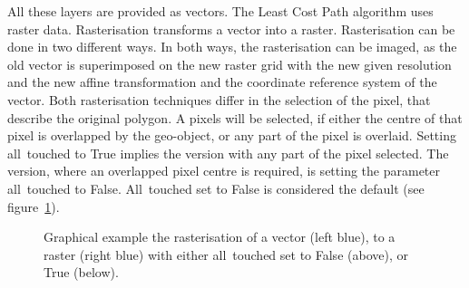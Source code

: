All these layers are provided as vectors.
The Least Cost Path algorithm uses raster data.
Rasterisation transforms a vector into a raster.
Rasterisation can be done in two different ways.
In both ways, the rasterisation can be imaged, as the old vector is superimposed on the new raster grid with the new
given resolution and the new affine transformation and the coordinate reference system of the vector.
Both rasterisation techniques differ in the selection of the pixel, that describe the original polygon.
A pixels will be selected, if either the centre of that pixel is overlapped
by the geo-object, or any part of the pixel is overlaid.
Setting all~touched to True implies the version with any part of the pixel selected.
The version, where an overlapped pixel centre is required, is setting the parameter all~touched to False.
All~touched set to False is considered the default (see figure~\ref{fig:alltouched}).
\begin{figure}[!ht]
	\centering

	\vspace*{5mm}
	\caption{Graphical example the rasterisation of a vector (left blue), to a raster (right blue) with either all~touched set to False (above), or True (below).}
	\label{fig:alltouched}

\end{figure}

